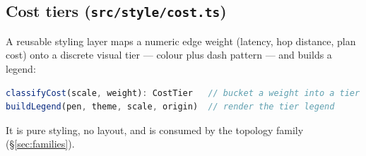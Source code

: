 \subsection{Cost tiers (\texttt{src/style/cost.ts})}

A reusable styling layer maps a numeric edge weight (latency, hop distance, plan
cost) onto a discrete visual tier --- colour plus dash pattern --- and builds a
legend:

\begin{lstlisting}[language=ts]
classifyCost(scale, weight): CostTier   // bucket a weight into a tier
buildLegend(pen, theme, scale, origin)  // render the tier legend
\end{lstlisting}

It is pure styling, no layout, and is consumed by the topology family
(\S\ref{sec:families}).
